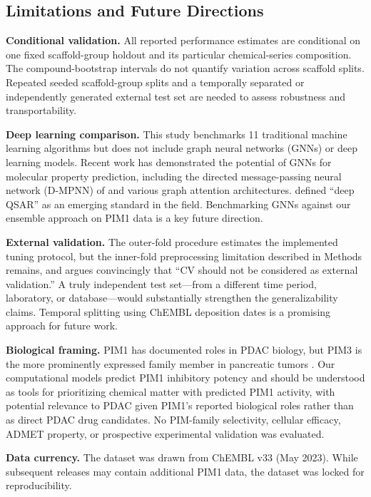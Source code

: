 \documentclass[11pt]{article}
\begin{document}
\subsection{Limitations and Future Directions}

\textbf{Conditional validation.}
All reported performance estimates are conditional on one fixed scaffold-group holdout and
its particular chemical-series composition. The compound-bootstrap intervals do not quantify
variation across scaffold splits. Repeated seeded scaffold-group splits and a temporally
separated or independently generated external test set are needed to assess robustness and
transportability.

\textbf{Deep learning comparison.}
This study benchmarks 11 traditional machine learning algorithms but does not include
graph neural networks (GNNs) or deep learning models.
Recent work has demonstrated the potential of GNNs for molecular property prediction,
including the directed message-passing neural network (D-MPNN) of \citet{yang2019analyzing}
and various graph attention architectures.
\citet{tropsha2024integrating} defined ``deep QSAR'' as an emerging standard in the field.
Benchmarking GNNs against our ensemble approach on PIM1 data is a key future direction.

\textbf{External validation.}
The outer-fold procedure estimates the implemented tuning protocol, but the inner-fold
preprocessing limitation described in Methods remains, and \citet{gramatica2014external}
argues convincingly that ``CV should not be considered as external validation.''
A truly independent test set---from a different time period, laboratory, or database---would
substantially strengthen the generalizability claims.
Temporal splitting using ChEMBL deposition dates is a promising approach for future work.

\textbf{Biological framing.}
PIM1 has documented roles in PDAC biology, but PIM3 is the more prominently expressed
family member in pancreatic tumors \citep{li2006pim3}.
Our computational models predict PIM1 inhibitory potency and should be understood as
tools for prioritizing chemical matter with predicted PIM1 activity, with potential
relevance to PDAC given PIM1's reported biological roles rather than as direct PDAC
drug candidates. No PIM-family selectivity, cellular efficacy, ADMET property, or prospective
experimental validation was evaluated.

\textbf{Data currency.}
The dataset was drawn from ChEMBL v33 (May 2023).
While subsequent releases may contain additional PIM1 data, the dataset was locked for
reproducibility.
\end{document}

